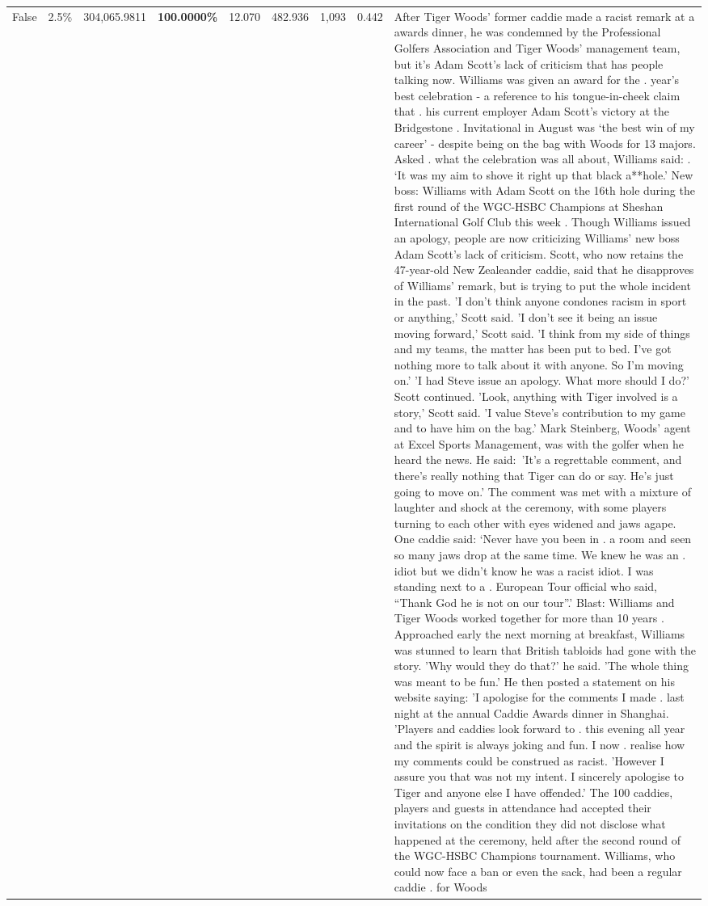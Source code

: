 \begin{table}[H]
\begin{tabular}{lllrlllll}
False & 2.5\% & \color{red} 304,065.9811 & \bfseries \color{red} 100.0000\% & 12.070 & 482.936 & 1,093 & 0.442 & After Tiger Woods' former caddie made a racist remark at a awards dinner, he was condemned by the Professional Golfers Association and Tiger Woods' management team, but it's Adam Scott's lack of criticism that has people talking now. Williams was given an award for the . year’s best celebration - a reference to his tongue-in-cheek claim that . his current employer Adam Scott’s victory at the Bridgestone . Invitational in August was ‘the best win of my career’ - despite being on the bag with Woods for 13 majors. Asked . what the celebration was all about, Williams said: . ‘It was my aim to shove it right up that black a**hole.’ New boss: Williams with Adam Scott  on the 16th hole during the first round of the WGC-HSBC Champions at Sheshan International Golf Club this week . Though Williams issued an apology, people are now criticizing Williams' new boss Adam Scott's lack of criticism. Scott, who now retains the 47-year-old New Zealeander caddie, said that he disapproves of Williams' remark, but is trying to put the whole incident in the past. 'I don't think anyone condones racism in sport or anything,' Scott said. 'I don't see it being an issue moving forward,' Scott said. 'I think from my side of things and my teams, the matter has been put to bed. I've got nothing more to talk about it with anyone. So I'm moving on.' 'I had Steve issue an apology. What more should I do?' Scott continued. 'Look, anything with Tiger involved is a story,' Scott said. 'I value Steve's contribution to my game and to have him on the bag.' Mark Steinberg, Woods' agent at Excel Sports Management, was with the golfer when he heard the news. He said: 'It's a regrettable comment, and there's really nothing that Tiger can do or say. He's just going to move on.' The comment was met with a mixture of laughter and shock at the ceremony, with some players turning to each other with eyes widened and jaws agape. One caddie said: ‘Never have you been in . a room and seen so many jaws drop at the same time. We knew he was an . idiot but we didn’t know he was a racist idiot. I was standing next to a . European Tour official who said, “Thank God he is not on our tour”.’ Blast: Williams and Tiger Woods worked together for more than 10 years . Approached early the next morning at breakfast, Williams was stunned to learn that British tabloids had gone with the story. 'Why would they do that?' he said. 'The whole thing was meant to be fun.' He then posted a statement on his website saying: 'I apologise for the comments I made . last night at the annual Caddie Awards dinner in Shanghai. 'Players and caddies look forward to . this evening all year and the spirit is always joking and fun. I now . realise how my comments could be construed as racist. 'However I assure you that was not my intent. I sincerely apologise to Tiger and anyone else I have offended.' The 100 caddies, players and guests in attendance had accepted their invitations on the condition they did not disclose what happened at the ceremony, held after the second round of the WGC-HSBC Champions tournament. Williams, who could now face a ban or even the sack, had been a regular caddie . for Woods 
\end{tabular}
\end{table}
